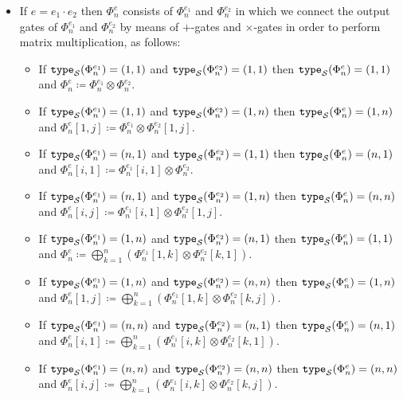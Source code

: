 \begin{itemize}
%
%
\item 
If $e=e_1\cdot e_2$ then $\Phi_n^e$ consists of $\Phi_n^{e_1}$ and $\Phi_n^{e_2}$ in which we connect the output gates of $\Phi_n^{e_1}$ and $\Phi_n^{e_2}$
by means of $+$-gates and $\times$-gates in order to perform matrix multiplication, as follows:

\begin{itemize}
	\item If $\texttt{type}_{\mathcal{S}}(\Phi^{e_1}_n)=(1,1)$ and $\texttt{type}_{\mathcal{S}}(\Phi^{e_2}_n)=(1, 1)$ then $\texttt{type}_{\mathcal{S}}(\Phi^{e}_n)=(1, 1)$ and $\Phi^{e}_n\coloneqq \Phi^{e_1}_n \otimes \Phi^{e_2}_n$.
  \item If $\texttt{type}_{\mathcal{S}}(\Phi^{e_1}_n)=(1,1)$ and $\texttt{type}_{\mathcal{S}}(\Phi^{e_2}_n)=(1, n)$ then $\texttt{type}_{\mathcal{S}}(\Phi^{e}_n)=(1, n)$ and $\Phi^{e}_n[1,j]\coloneqq \Phi^{e_1}_n \otimes \Phi^{e_2}_n[1,j]$.
  \item If $\texttt{type}_{\mathcal{S}}(\Phi^{e_1}_n)=(n,1)$ and $\texttt{type}_{\mathcal{S}}(\Phi^{e_2}_n)=(1, 1)$ then $\texttt{type}_{\mathcal{S}}(\Phi^{e}_n)=(n, 1)$ and $\Phi^{e}_n[i,1]\coloneqq \Phi^{e_1}_n[i,1] \otimes \Phi^{e_2}_n$.
  \item If $\texttt{type}_{\mathcal{S}}(\Phi^{e_1}_n)=(n,1)$ and $\texttt{type}_{\mathcal{S}}(\Phi^{e_2}_n)=(1, n)$ then $\texttt{type}_{\mathcal{S}}(\Phi^{e}_n)=(n, n)$ and $\Phi^{e}_n[i,j]\coloneqq \Phi^{e_1}_n[i,1] \otimes \Phi^{e_2}_n[1,j]$.
  \item If $\texttt{type}_{\mathcal{S}}(\Phi^{e_1}_n)=(1,n)$ and $\texttt{type}_{\mathcal{S}}(\Phi^{e_2}_n)=(n, 1)$ then $\texttt{type}_{\mathcal{S}}(\Phi^{e}_n)=(1, 1)$ and $\Phi^{e}_n\coloneqq \bigoplus_{k=1}^n \left( \Phi^{e_1}_n[1,k] \otimes \Phi^{e_2}_n[k,1] \right)$.
  \item If $\texttt{type}_{\mathcal{S}}(\Phi^{e_1}_n)=(1,n)$ and $\texttt{type}_{\mathcal{S}}(\Phi^{e_2}_n)=(n, n)$ then $\texttt{type}_{\mathcal{S}}(\Phi^{e}_n)=(1, n)$ and $\Phi^{e}_n[1,j]\coloneqq \bigoplus_{k=1}^n \left( \Phi^{e_1}_n[1,k] \otimes \Phi^{e_2}_n[k,j] \right)$.
  \item If $\texttt{type}_{\mathcal{S}}(\Phi^{e_1}_n)=(n,n)$ and $\texttt{type}_{\mathcal{S}}(\Phi^{e_2}_n)=(n, 1)$ then $\texttt{type}_{\mathcal{S}}(\Phi^{e}_n)=(n, 1)$ and $\Phi^{e}_n[i,1]\coloneqq \bigoplus_{k=1}^n \left( \Phi^{e_1}_n[i,k] \otimes \Phi^{e_2}_n[k,1] \right)$.
  \item If $\texttt{type}_{\mathcal{S}}(\Phi^{e_1}_n)=(n,n)$ and $\texttt{type}_{\mathcal{S}}(\Phi^{e_2}_n)=(n, n)$ then $\texttt{type}_{\mathcal{S}}(\Phi^{e}_n)=(n, n)$ and $\Phi^{e}_n[i,j]\coloneqq \bigoplus_{k=1}^n \left( \Phi^{e_1}_n[i,k] \otimes \Phi^{e_2}_n[k,j] \right)$.

\end{itemize}
\end{itemize}
